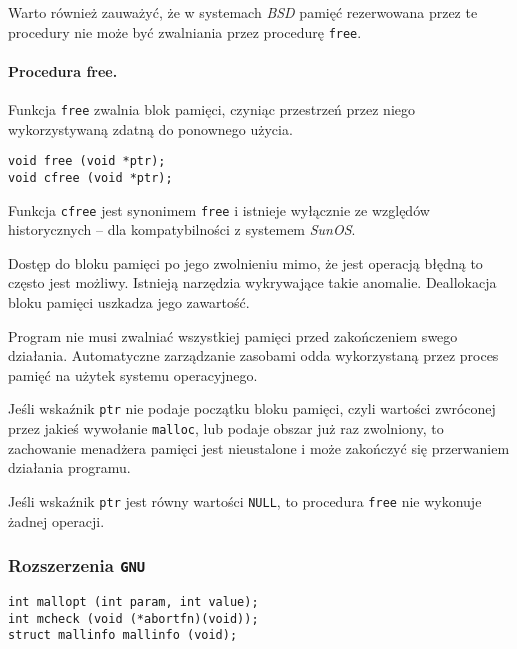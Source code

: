 \documentclass[12pt,a4paper,titlepage,twoside]{mwart}
\begin{document}
Warto również zauważyć, że w systemach \textit{BSD} pamięć rezerwowana przez te
procedury nie może być zwalniania przez procedurę \texttt{free}.

\paragraph{Procedura free.}

Funkcja \texttt{free} zwalnia blok pamięci, czyniąc przestrzeń przez niego
wykorzystywaną zdatną do ponownego użycia.

\vspace{2ex}
\begin{lstlisting}[caption={Prototyp procedury \texttt{free} i \texttt{cfree}.}]
void free (void *ptr);
void cfree (void *ptr);
\end{lstlisting}

Funkcja \texttt{cfree} jest synonimem \texttt{free} i istnieje wyłącznie ze
względów historycznych -- dla kompatybilności z systemem \textit{SunOS}.

Dostęp do bloku pamięci po jego zwolnieniu mimo, że jest operacją błędną to
często jest możliwy. Istnieją narzędzia wykrywające takie anomalie. Deallokacja
bloku pamięci uszkadza jego zawartość.

Program nie musi zwalniać wszystkiej pamięci przed zakończeniem swego
działania. Automatyczne zarządzanie zasobami odda wykorzystaną przez proces
pamięć na użytek systemu operacyjnego.

Jeśli wskaźnik \texttt{ptr} nie podaje początku bloku pamięci, czyli wartości
zwróconej przez jakieś wywołanie \texttt{malloc}, lub podaje obszar już raz
zwolniony, to zachowanie menadżera pamięci jest nieustalone i może
zakończyć się przerwaniem działania programu.

Jeśli wskaźnik \texttt{ptr} jest równy wartości \texttt{NULL}, to procedura
\texttt{free} nie wykonuje żadnej operacji.

\subsubsection{Rozszerzenia \texttt{GNU}}

\vspace{2ex}
\begin{lstlisting}[caption={Prototypy pozostałych procedur i zmiennych.}]
int mallopt (int param, int value);
int mcheck (void (*abortfn)(void));
struct mallinfo mallinfo (void);
\end{lstlisting}
\end{document}
